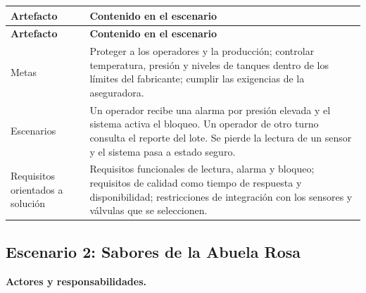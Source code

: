 \documentclass[12pt,a4paper]{article}
\begin{document}
{\small
\setlength{\tabcolsep}{4pt}
\renewcommand{\arraystretch}{1.3}
\begin{longtable}{
|>{\raggedright\arraybackslash}p{}
|>{\raggedright\arraybackslash}p{}|}
\hline
\textbf{Artefacto} & \textbf{Contenido en el escenario} \\
\hline
\endfirsthead
\hline
\textbf{Artefacto} & \textbf{Contenido en el escenario} \\
\hline
\endhead
Metas & Proteger a los operadores y la producción; controlar temperatura, presión y niveles de tanques dentro de los límites del fabricante; cumplir las exigencias de la aseguradora. \\
\hline
Escenarios & Un operador recibe una alarma por presión elevada y el sistema activa el bloqueo. Un operador de otro turno consulta el reporte del lote. Se pierde la lectura de un sensor y el sistema pasa a estado seguro. \\
\hline
Requisitos orientados a solución & Requisitos funcionales de lectura, alarma y bloqueo; requisitos de calidad como tiempo de respuesta y disponibilidad; restricciones de integración con los sensores y válvulas que se seleccionen. \\
\hline
\end{longtable}
}

\subsection{Escenario 2: Sabores de la Abuela Rosa}

\textbf{Actores y responsabilidades.}
\end{document}
